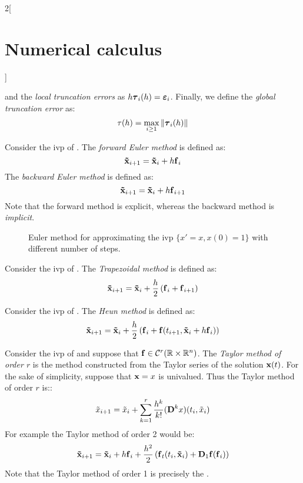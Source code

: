 \documentclass[../../../main_math.tex]{subfiles}
\begin{document}
\begin{multicols}{2}[\section{Numerical calculus}]
\begin{definition}
    and the \emph{local truncation errors} as $h\boldsymbol{\mathrm{\tau}}_{i}(h)=\boldsymbol{\mathrm{\varepsilon}}_i$. Finally, we define the \emph{global truncation error} as: $$\tau(h)=\max_{i\geq 1}\left\|\boldsymbol{\mathrm{\tau}}_i(h)\right\|$$
  \end{definition}
  \begin{definition}\label{NC:euler}
    Consider the ivp of . The \emph{forward Euler method} is defined as:
    $$\boldsymbol{\mathrm{\tilde{x}}}_{i+1}=\boldsymbol{\mathrm{\tilde{x}}}_{i}+h\boldsymbol{\mathrm{f}}_i$$
    The \emph{backward Euler method} is defined as:
    $$\boldsymbol{\mathrm{\tilde{x}}}_{i+1}=\boldsymbol{\mathrm{\tilde{x}}}_{i}+h\boldsymbol{\mathrm{f}}_{i+1}$$
    Note that the forward method is explicit, whereas the backward method is \emph{implicit}.
  \end{definition}
  \begin{figure}[H]
    \centering
    
    \caption{Euler method for approximating the ivp $\{x'=x, x(0)=1\}$ with different number of steps.}
    \label{NC:euler_fig}
  \end{figure}
  \begin{definition}
    Consider the ivp of . The \emph{Trapezoidal method} is defined as:
    $$\boldsymbol{\mathrm{\tilde{x}}}_{i+1}=\boldsymbol{\mathrm{\tilde{x}}}_{i}+\frac{h}{2}\left(\boldsymbol{\mathrm{f}}_i+\boldsymbol{\mathrm{f}}_{i+1}\right)$$
  \end{definition}
  \begin{definition}
    Consider the ivp of . The \emph{Heun method} is defined as:
    $$\boldsymbol{\mathrm{\tilde{x}}}_{i+1}=\boldsymbol{\mathrm{\tilde{x}}}_{i}+\frac{h}{2}\left(\boldsymbol{\mathrm{f}}_i+\boldsymbol{\mathrm{f}}(t_{i+1},\boldsymbol{\mathrm{\tilde{x}}}_{i}+h\boldsymbol{\mathrm{f}}_i)\right)$$
  \end{definition}
  \begin{definition}
    Consider the ivp of  and suppose that $\boldsymbol{\mathrm{f}}\in\mathcal{C}^r(\mathbb{R}\times\mathbb{R}^n)$. The \emph{Taylor method of order $r$} is the method constructed from the Taylor series of the solution $\boldsymbol{\mathrm{x}}(t)$. For the sake of simplicity, suppose that $\boldsymbol{\mathrm{x}}=x$ is univalued. Thus the Taylor method of order $r$ is::
    $$\tilde{x}_{i+1}=\tilde{x}_{i}+\sum_{k=1}^r\frac{h^k}{k!}(\boldsymbol{\mathrm{D}}^k{x})(t_i,\tilde{x}_{i})$$
    For example the Taylor method of order 2 would be:
    $$\boldsymbol{\mathrm{\tilde{x}}}_{i+1}=\boldsymbol{\mathrm{\tilde{x}}}_{i}+h\boldsymbol{\mathrm{f}}_i+\frac{h^2}{2}\left(\boldsymbol{\mathrm{f}}_t(t_i,\boldsymbol{\mathrm{\tilde{x}}}_{i})+\boldsymbol{\mathrm{D}}_1\boldsymbol{\mathrm{f}}(\boldsymbol{\mathrm{f}}_i)\right)$$
    Note that the Taylor method of order 1 is precisely the .
  \end{definition}
  \begin{definition}

\end{definition}
\end{multicols}
\end{document}
